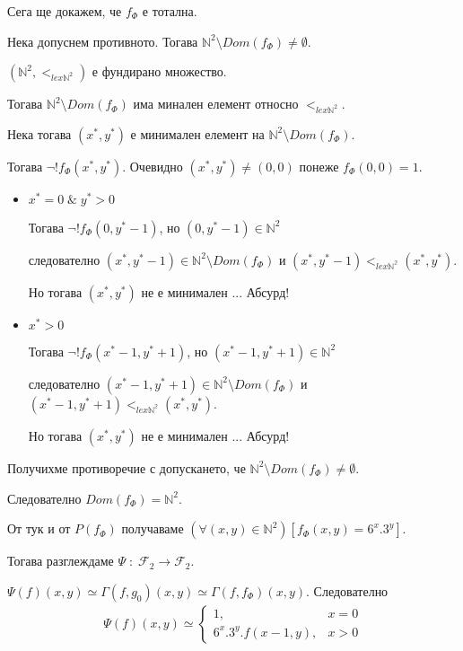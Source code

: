 \documentclass{article}
\begin{document}
Сега ще докажем, че \(f_\Phi\) е тотална.

Нека допуснем противното. Тогава \(\mathbb{N}^2 \setminus Dom(f_\Phi) \neq \emptyset\).

\((\mathbb{N}^2, <_{lex \mathbb{N}^2})\) е фундирано множество.

Тогава \(\mathbb{N}^2 \setminus Dom(f_\Phi)\) има минален елемент относно \(<_{lex \mathbb{N}^2}\).

Нека тогава \((x^*, y^*)\) е минимален елемент на \(\mathbb{N}^2 \setminus Dom(f_\Phi)\).

Тогава \(\lnot!f_\Phi(x^*, y^*)\). Очевидно \((x^*, y^*) \neq (0, 0)\) понеже \(f_\Phi(0, 0) = 1\).

\begin{itemize}
\item \(x^* = 0 \; \& \; y^* > 0\)

Тогава \(\lnot!f_\Phi(0, y^* - 1)\), но \((0, y^* - 1) \in \mathbb{N}^2\)

следователно \((x^*, y^* - 1) \in \mathbb{N}^2 \setminus Dom(f_\Phi)\) и \((x^*, y^* - 1) <_{lex \mathbb{N^2}} (x^*, y^*)\).

Но тогава \((x^*, y^*)\) не е минимален ... Абсурд!
\item \(x^* > 0\)

Тогава \(\lnot!f_\Phi(x^* - 1, y^* + 1)\), но \((x^* - 1, y^* + 1) \in \mathbb{N}^2\)

следователно \((x^* - 1, y^* + 1) \in \mathbb{N}^2 \setminus Dom(f_\Phi)\) и \((x^* - 1, y^* + 1) <_{lex \mathbb{N^2}} (x^*, y^*)\).

Но тогава \((x^*, y^*)\) не е минимален ... Абсурд!
\end{itemize}

Получихме противоречие с допускането, че \(\mathbb{N}^2 \setminus Dom(f_\Phi) \neq \emptyset\).

Следователно \(Dom(f_\Phi) = \mathbb{N}^2\).

От тук и от \(P(f_\Phi)\) получаваме \((\forall (x, y) \in \mathbb{N}^2)[f_\Phi(x, y) = 6^x.3^y]\).

Тогава разглеждаме \(\Psi \; : \; \mathcal{F}_2 \to \mathcal{F}_2\).

\(\Psi(f)(x, y) \simeq \Gamma(f, g_0)(x, y) \simeq \Gamma(f, f_\Phi)(x, y)\). Следователно
\begin{align*}
\Psi(f)(x, y) \simeq \begin{cases}
    1, & x = 0 \\
    6^x.3^y.f(x - 1, y), & x > 0
\end{cases}    
\end{align*}
\end{document}
